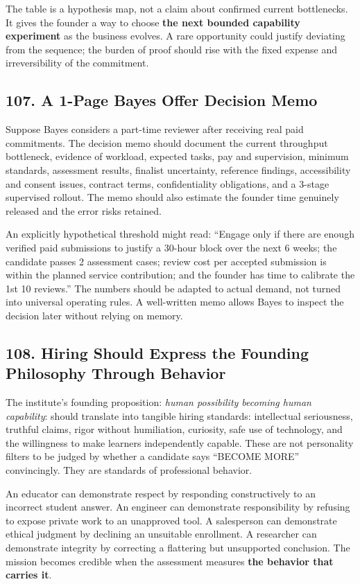 The table is a hypothesis map, not a claim about confirmed current bottlenecks. It gives the founder a way to choose \textbf{the next bounded capability experiment} as the business evolves. A rare opportunity could justify deviating from the sequence; the burden of proof should rise with the fixed expense and irreversibility of the commitment.

\subsection*{107. A 1-Page Bayes Offer Decision Memo}

Suppose Bayes considers a part-time reviewer after receiving real paid commitments. The decision memo should document the current throughput bottleneck, evidence of workload, expected tasks, pay and supervision, minimum standards, assessment results, finalist uncertainty, reference findings, accessibility and consent issues, contract terms, confidentiality obligations, and a 3-stage supervised rollout. The memo should also estimate the founder time genuinely released and the error risks retained.

An explicitly hypothetical threshold might read: ``Engage only if there are enough verified paid submissions to justify a 30-hour block over the next 6 weeks; the candidate passes 2 assessment cases; review cost per accepted submission is within the planned service contribution; and the founder has time to calibrate the 1st 10 reviews.'' The numbers should be adapted to actual demand, not turned into universal operating rules. A well-written memo allows Bayes to inspect the decision later without relying on memory.

\subsection*{108. Hiring Should Express the Founding Philosophy Through Behavior}

The institute's founding proposition: \textit{human possibility becoming human capability}: should translate into tangible hiring standards: intellectual seriousness, truthful claims, rigor without humiliation, curiosity, safe use of technology, and the willingness to make learners independently capable. These are not personality filters to be judged by whether a candidate says ``BECOME MORE'' convincingly. They are standards of professional behavior.

An educator can demonstrate respect by responding constructively to an incorrect student answer. An engineer can demonstrate responsibility by refusing to expose private work to an unapproved tool. A salesperson can demonstrate ethical judgment by declining an unsuitable enrollment. A researcher can demonstrate integrity by correcting a flattering but unsupported conclusion. The mission becomes credible when the assessment measures \textbf{the behavior that carries it}.

